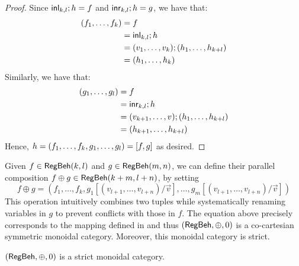 \begin{proof}
	Since $\mathsf{inl}_{k,l} ; h = f$ and $\mathsf{inr}_{k,l} ; h = g$, we have that:
	\begin{align*}
		(f_1, \dots, f_k) &= f\\ 
		&= \mathsf{inl}_{k,l} ; h\\
		&= (v_1, \dots, v_k) ; (h_1, \dots, h_{k + l}) \\
		&= (h_1, \dots, h_k)
	\end{align*}
	Similarly, we have that:
	\begin{align*}
		(g_1, \dots, g_l) &= f\\ 
		&= \mathsf{inr}_{k,l} ; h\\
		&= (v_{k+1}, \dots, v_{}) ; (h_1, \dots, h_{k + l}) \\
		&= (h_{k+1}, \dots, h_{k + l})
	\end{align*}
	Hence, $h = (f_1, \dots, f_k, g_1, \dots, g_l) = [ f , g ]$ as desired. 
\end{proof}
Given $f \in \mathsf{RegBeh}(k,l)$ and $g \in \mathsf{RegBeh}(m,n)$, we can define their parallel composition $f \oplus g \in \mathsf{RegBeh}(k + m, l + n)$, by setting $$f \oplus g = (f_1, \dots, f_k, g_1[(v_{l + 1},\dots, v_{l + n})/\vec{v}], \dots, g_m[(v_{l + 1},\dots, v_{l + n})/\vec{v}])$$ 
This operation intuitively combines two tuples while systematically renaming variables in $g$ to prevent conflicts with those in $f$. The equation above precisely corresponds to the mapping defined in  and thus $(\mathsf{RegBeh}, \oplus , 0 )$ is a co-cartesian symmetric monoidal category. Moreover, this monoidal category is strict.
\begin{proposition}
	$(\mathsf{RegBeh}, \oplus , 0 )$ is a strict monoidal category.
\end{proposition}
